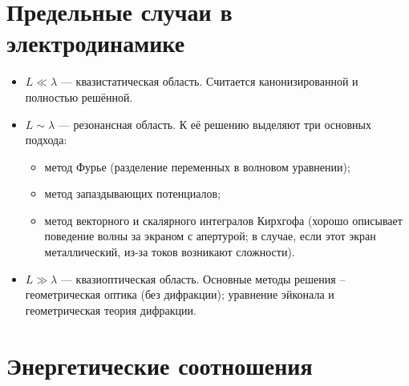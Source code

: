 \section{Предельные случаи в электродинамике}
\begin{itemize}
  \item \(L \ll \lambda\) --- квазистатическая область. Считается
  канонизированной и полностью решённой.
  \item \(L \sim \lambda\) --- резонансная область. К её решению выделяют три
  основных подхода:
  \begin{itemize}
    \item метод Фурье (разделение переменных в волновом уравнении);
    \item метод запаздывающих потенциалов;
    \item метод векторного и скалярного интегралов Кирхгофа (хорошо описывает
    поведение волны за экраном с апертурой; в случае, если этот экран
    металлический, из-за токов возникают сложности).
  \end{itemize}
  \item \(L \gg \lambda\) --- квазиоптическая область. Основные методы решения
  -- геометрическая оптика (без дифракции); уравнение эйконала и геометрическая
  теория дифракции.
\end{itemize}

\section{Энергетические соотношения}
